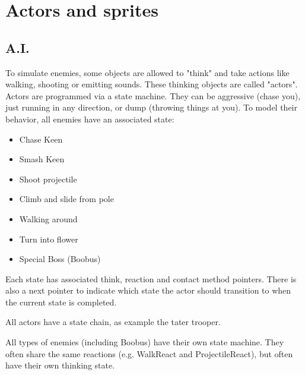 \documentclass[book.tex]{subfiles}
\begin{document}
\section{Actors and sprites}
\label{section:actors_and_sprites}

\subsection{A.I.}
To simulate enemies, some objects are allowed to "think" and take actions like walking,
shooting or emitting sounds. These thinking objects are called "actors".
Actors are programmed via a state machine. They can be aggressive (chase you), just running in any direction, or dump (throwing things at you). To model their behavior, all enemies have an associated state:
\begin{itemize}
  \item Chase Keen
  \item Smash Keen
  \item Shoot projectile
  \item Climb and slide from pole
  \item Walking around
  \item Turn into flower
  \item Special Boss (Boobus)
\end{itemize}
\par

Each state has associated think, reaction and contact method pointers. There is also a next
pointer to indicate which state the actor should transition to when the current state is completed.\\
\par
\begin{minipage}{\textwidth}
  
\end{minipage}
\label{state_type}
\par

All actors have a state chain, as example the tater trooper.\\
\par
\begin{minipage}{\textwidth}

\end{minipage}
\par
All types of enemies (including Boobus) have their own state machine. They often share
the same reactions (e.g. WalkReact and ProjectileReact), but often have their own thinking state.
\end{document}
